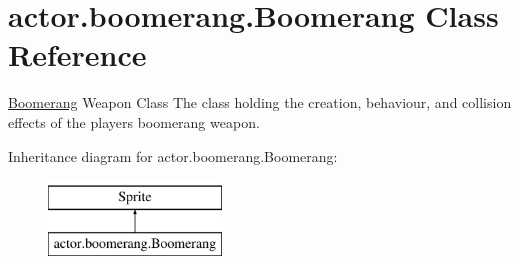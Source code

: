 \hypertarget{classactor_1_1boomerang_1_1_boomerang}{}\section{actor.\+boomerang.\+Boomerang Class Reference}
\label{classactor_1_1boomerang_1_1_boomerang}


\hyperlink{classactor_1_1boomerang_1_1_boomerang}{Boomerang} Weapon Class  The class holding the creation, behaviour, and collision effects of the player\textquotesingle{}s boomerang weapon.  


Inheritance diagram for actor.\+boomerang.\+Boomerang\+:\begin{figure}[H]
\begin{center}
\leavevmode
\includegraphics[height=2.000000cm]{classactor_1_1boomerang_1_1_boomerang}
\end{center}
\end{figure}
